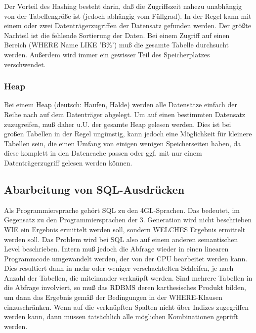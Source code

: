 Der Vorteil des Hashing besteht darin, daß die Zugriffszeit nahezu unabhängig von der Tabellengröße ist (jedoch abhängig vom Füllgrad). In der Regel kann mit einem oder zwei Datenträgerzugriffen der Datensatz gefunden werden.
Der größte Nachteil ist die fehlende Sortierung der Daten. Bei einem Zugriff auf einen Bereich (WHERE Name LIKE 'B\%') muß die gesamte Tabelle durchsucht werden. Außerdem wird immer ein gewisser Teil des Speicherplatzes verschwendet.

\subsubsection{Heap} 
Bei einem Heap (deutsch: Haufen, Halde) werden alle Datensätze einfach der Reihe nach auf dem Datenträger abgelegt. Um auf einen bestimmten Datensatz zuzugreifen, muß daher u.U. der gesamte Heap gelesen werden. Dies ist bei großen Tabellen in der Regel ungünstig, kann jedoch eine Möglichkeit für kleinere Tabellen sein, die einen Umfang von einigen wenigen Speicherseiten haben, da diese komplett in den Datencache passen oder ggf. mit nur einem Datenträgerzugriff gelesen werden können.

\subsection{Abarbeitung von SQL-Ausdrücken}
Als Programmiersprache gehört SQL zu den 4GL-Sprachen. Das bedeutet, im Gegensatz zu den Programmiersprachen der 3. Generation wird nicht beschrieben WIE ein Ergebnis ermittelt werden soll, sondern WELCHES Ergebnis ermittelt werden soll. Das Problem wird bei SQL also auf einem anderen semantischen Level beschrieben. Intern muß jedoch die Abfrage wieder in einen linearen Programmcode umgewandelt werden, der von der CPU bearbeitet werden kann. Dies resultiert dann in mehr oder weniger verschachtelten Schleifen, je nach Anzahl der Tabellen, die miteinander verknüpft werden.
Sind mehrere Tabellen in die Abfrage involviert, so muß das RDBMS deren karthesisches Produkt bilden, um dann das Ergebnis gemäß der Bedingungen in der WHERE-Klausen einzuschränken. Wenn auf die verknüpften Spalten nicht über Indizes zugegriffen werden kann, dann müssen tatsächlich alle möglichen Kombinationen geprüft werden.

